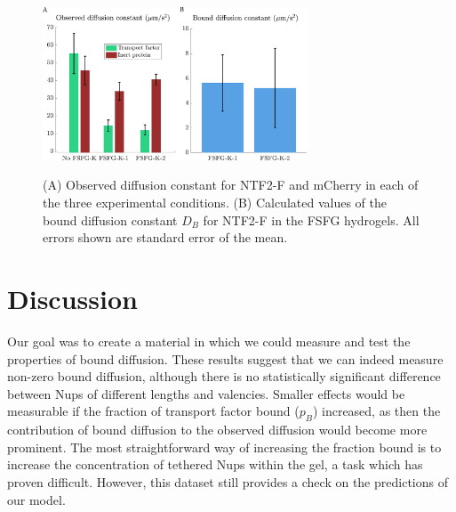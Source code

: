 \begin{figure}
\caption[Observed diffusion constants and NTF2 bound diffusion.]{(A) Observed diffusion constant for NTF2-F and mCherry in each of the three experimental conditions. (B) Calculated values of the bound diffusion constant $D_B$ for NTF2-F in the FSFG hydrogels.  All errors shown are standard error of the mean. \\}
\centering
\includegraphics[width=0.7\textwidth]{figs/ch04/bound-diffusion}
\label{fig:bound-diffusion}
\end{figure} 




\section{Discussion} 

Our goal was to create a material in which we could measure and test the properties of bound diffusion.  These results suggest that we can indeed measure non-zero bound diffusion, although there is no statistically significant difference between Nups of different lengths and valencies.  Smaller effects would be measurable if the fraction of transport factor bound ($p_B$) increased, as then the contribution of bound diffusion to the observed diffusion would become more prominent.  The most straightforward way of increasing the fraction bound is to increase the concentration of tethered Nups within the gel, a task which has proven difficult.  However, this dataset still provides a check on the predictions of our model.

